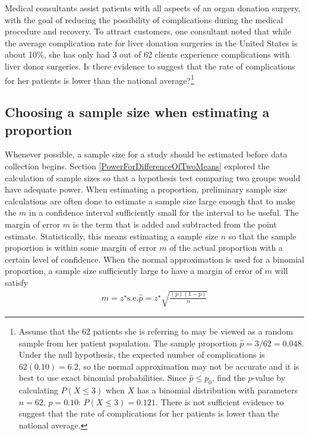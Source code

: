 \begin{exercise} Medical consultants assist patients with all aspects of an organ donation surgery, with the goal of reducing the possibility of complications during the medical procedure and recovery. To attract customers, one consultant noted that while the average complication rate for liver donation surgeries in the United States is about 10\%, she has only had 3 out of 62 clients experience complications with liver donor surgeries. Is there evidence to suggest that the rate of complications for her patients is lower than the national average?\footnote{Assume that the 62 patients she is referring to may be viewed as a random sample from her patient population. The sample proportion $\hat{p} = 3/62 = 0.048$. Under the null hypothesis, the expected number of complications is $62(0.10) = 6.2$, so the normal approximation may not be accurate and it is best to use exact binomial probabilities. Since $\hat{p} \leq p_0$, find the $p$-value by calculating $P(X \leq 3)$ when $X$ has a binomial distribution with parameters $n = 62,\, p = 0.10$: $P(X \leq 3) = 0.121$. There is not sufficient evidence to suggest that the rate of complications for her patients is lower than the national average.}
\end{exercise}


\subsection{Choosing a sample size when estimating a proportion}


Whenever possible, a sample size for a study should be estimated before data collection begins.  Section \ref{PowerForDifferenceOfTwoMeans} explored the calculation of sample sizes so that a hypothesis test comparing two groups would have adequate power.  When estimating a proportion, preliminary sample size calculations are often done to estimate a sample size large enough that to make the  $m$ in a confidence interval  sufficiently small for the interval to be useful. The margin of error $m$ is the term that is added and subtracted from the point estimate.  Statistically, this means estimating a sample size $n$ so that the sample proportion is within some margin of error $m$ of the actual proportion with a certain level of confidence. When the normal approximation is used for a binomial proportion, a sample size sufficiently large to have a margin of error of $m$ will satisfy 
\begin{align*}
 m = z^{\star}\text{s.e.}\hat{p} = z^{\star} \sqrt{\frac{(p)(1 - p)}{n}} 
\end{align*}


